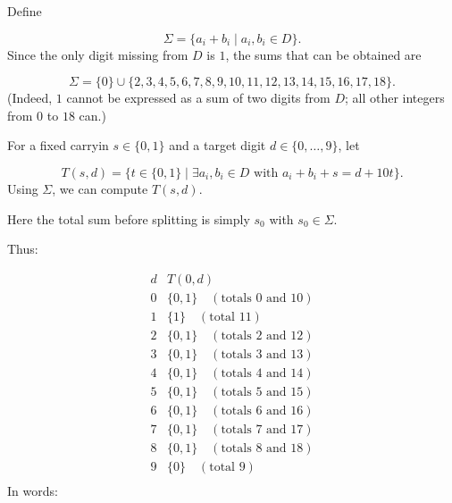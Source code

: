 Define\par
\[
\Sigma = \{ a_i+b_i \mid a_i,b_i \in D \}.
\]
Since the only digit missing from \(D\) is \(1\), the sums that can be obtained are\par
\[
\Sigma = \{0\} \cup \{2,3,4,5,6,7,8,9,10,11,12,13,14,15,16,17,18\}.
\]
(Indeed, \(1\) cannot be expressed as a sum of two digits from \(D\); all other integers from \(0\) to \(18\) can.)\par
{}
For a fixed carryin \(s \in \{0,1\}\) and a target digit \(d \in \{0,\dots,9\}\), let\par
\[
T(s,d) = \bigl\{ t \in \{0,1\} \;\big|\; \exists a_i,b_i\in D \text{ with } a_i+b_i+s = d+10t \bigr\}.
\]
Using \(\Sigma\), we can compute \(T(s,d)\).\par
{}
Here the total sum before splitting is simply \(s_0\) with \(s_0 \in \Sigma\).\par
{}
Thus:\par
\[
\begin{array}{c|l}
d & T(0,d) \\ \hline
0 & \{0,1\} \quad (\text{totals }0\text{ and }10) \\
1 & \{1\} \quad (\text{total }11) \\
2 & \{0,1\} \quad (\text{totals }2\text{ and }12) \\
3 & \{0,1\} \quad (\text{totals }3\text{ and }13) \\
4 & \{0,1\} \quad (\text{totals }4\text{ and }14) \\
5 & \{0,1\} \quad (\text{totals }5\text{ and }15) \\
6 & \{0,1\} \quad (\text{totals }6\text{ and }16) \\
7 & \{0,1\} \quad (\text{totals }7\text{ and }17) \\
8 & \{0,1\} \quad (\text{totals }8\text{ and }18) \\
9 & \{0\} \quad (\text{total }9) \\
\end{array}
\]
In words:\par
{}
